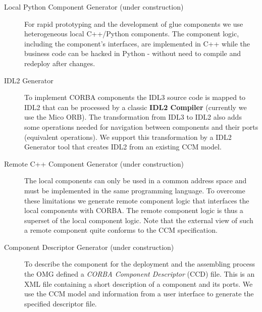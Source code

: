 \begin{description}
\item [Local Python Component Generator (under construction)]
For rapid prototyping and the development of glue components we use
heterogeneous local C++/Python components. The component logic, including the
component's interfaces, are implemented in C++ while the business code can be
hacked in Python - without need to compile and redeploy after changes.

\item [IDL2 Generator]
To implement CORBA components the IDL3 source code is mapped to IDL2 that can be
processed by a classic {\bf IDL2 Compiler} (currently we use the Mico ORB). The
transformation from IDL3 to IDL2 also adds some operations needed for navigation
between components and their ports (equivalent operations). We support this
transformation by a IDL2 Generator tool that creates IDL2 from an existing CCM
model.

\item [Remote C++ Component Generator (under construction)]
The local components can only be used in a common address space and must be
implemented in the same programming language. To overcome these limitations we
generate remote component logic that interfaces the local components with CORBA.
The remote component logic is thus a superset of the local component logic. Note
that the external view of such a remote component quite conforms to the CCM
specification.

\item [Component Descriptor Generator (under construction)]
To describe the component for the deployment and the assembling process the OMG
defined a {\it CORBA Component Descriptor} (CCD) file. This is an XML file
containing a short description of a component and its ports. We use the CCM
model and information from a user interface to generate the specified descriptor
file.

\end{description}


